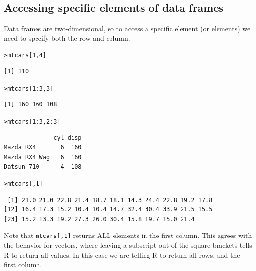 \documentclass[12pt,oneside]{book}\usepackage[]{graphicx}\usepackage[]{color}
\makeatletter
\newcommand{\hlnum}[1]{\textcolor[rgb]{0.686,0.059,0.569}{#1}}%
\newcommand{\hlopt}[1]{\textcolor[rgb]{0,0,0}{#1}}%
\newcommand{\hlstd}[1]{\textcolor[rgb]{0.345,0.345,0.345}{#1}}%
\newenvironment{kframe}{%
 \def\at@end@of@kframe{}%
 \ifinner\ifhmode%
  \def\at@end@of@kframe{\end{minipage}}%
  \begin{minipage}{\columnwidth}%
 \fi\fi%
 \def\FrameCommand##1{\hskip\@totalleftmargin \hskip-\fboxsep
 \colorbox{shadecolor}{##1}\hskip-\fboxsep
     \hskip-\linewidth \hskip-\@totalleftmargin \hskip\columnwidth}%
 \MakeFramed {\advance\hsize-\width
   \@totalleftmargin\z@ \linewidth\hsize
   \@setminipage}}%
 {\par\unskip\endMakeFramed%
 \at@end@of@kframe}
\newenvironment{knitrout}{}{} %
\makeatother
\begin{document}
\subsection{Accessing specific elements of data frames}
Data frames are two-dimensional, so to access a specific element (or elements) we need to specify both the row and column. 
\begin{knitrout}
\color{fgcolor}\begin{kframe}
\begin{alltt}
\hlstd{> }\hlstd{mtcars[}\hlnum{1}\hlstd{,} \hlnum{4}\hlstd{]}
\end{alltt}
\begin{verbatim}
[1] 110
\end{verbatim}
\begin{alltt}
\hlstd{> }\hlstd{mtcars[}\hlnum{1}\hlopt{:}\hlnum{3}\hlstd{,} \hlnum{3}\hlstd{]}
\end{alltt}
\begin{verbatim}
[1] 160 160 108
\end{verbatim}
\begin{alltt}
\hlstd{> }\hlstd{mtcars[}\hlnum{1}\hlopt{:}\hlnum{3}\hlstd{,} \hlnum{2}\hlopt{:}\hlnum{3}\hlstd{]}
\end{alltt}
\begin{verbatim}
              cyl disp
Mazda RX4       6  160
Mazda RX4 Wag   6  160
Datsun 710      4  108
\end{verbatim}
\begin{alltt}
\hlstd{> }\hlstd{mtcars[,} \hlnum{1}\hlstd{]}
\end{alltt}
\begin{verbatim}
 [1] 21.0 21.0 22.8 21.4 18.7 18.1 14.3 24.4 22.8 19.2 17.8
[12] 16.4 17.3 15.2 10.4 10.4 14.7 32.4 30.4 33.9 21.5 15.5
[23] 15.2 13.3 19.2 27.3 26.0 30.4 15.8 19.7 15.0 21.4
\end{verbatim}
\end{kframe}
\end{knitrout}
Note that \verb+mtcars[,1]+ returns ALL elements in the first column. This agrees with the behavior for vectors, where leaving a subscript out of the square brackets tells R to return all values. In this case we are telling R to return all rows, and the first column.
\end{document}
